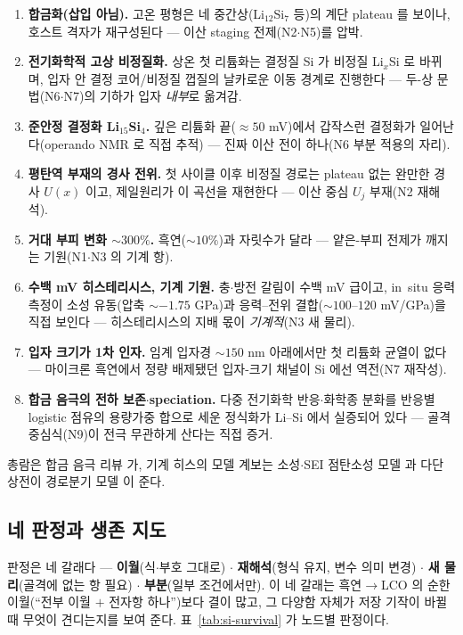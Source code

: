 \begin{enumerate}[label=(\roman*),leftmargin=2.2em,itemsep=1.5pt]
\item \textbf{합금화(삽입 아님).} 고온 평형은 네 중간상(Li$_{12}$Si$_7$ 등)의 계단 plateau 를
보이나\cite{wen_huggins1981}, 호스트 격자가 재구성된다 --- 이산 staging 전제(N2$\cdot$N5)를 압박.
\item \textbf{전기화학적 고상 비정질화.} 상온 첫 리튬화는 결정질 Si 가 비정질 Li$_x$Si 로 바뀌며,
입자 안 결정 코어/비정질 껍질의 날카로운 이동 경계로 진행한다\cite{limthongkul2003,li_dahn2007} ---
두-상 문법(N6$\cdot$N7)의 기하가 입자 \emph{내부}로 옮겨감.
\item \textbf{준안정 결정화 Li$_{15}$Si$_4$.} 깊은 리튬화 끝($\approx50$ mV)에서 갑작스런 결정화가
일어난다\cite{obrovac_christensen2004}(operando NMR 로 직접 추적\cite{ogata_nmr2014}) --- 진짜 이산
전이 하나(N6 부분 적용의 자리).
\item \textbf{평탄역 부재의 경사 전위.} 첫 사이클 이후 비정질 경로는 plateau 없는 완만한 경사 $U(x)$ 이고,
제일원리가 이 곡선을 재현한다\cite{chevrier_dahn2009} --- 이산 중심 $U_j$ 부재(N2 재해석).
\item \textbf{거대 부피 변화 $\sim300\%$.}\cite{beaulieu2001} 흑연($\sim10\%$)과 자릿수가 달라 ---
얕은-부피 전제가 깨지는 기원(N1$\cdot$N3 의 기계 항).
\item \textbf{수백 mV 히스테리시스, 기계 기원.} 충$\cdot$방전 갈림이 수백 mV 급이고, in~situ 응력 측정이
소성 유동(압축 $\sim-1.75$ GPa)과 응력--전위 결합($\sim100$--$120$ mV/GPa)을 직접
보인다\cite{sethuraman_stressevo2010,sethuraman_stresspot2010} --- 히스테리시스의 지배 몫이
\emph{기계적}(N3 새 물리).
\item \textbf{입자 크기가 1차 인자.} 임계 입자경 $\sim150$ nm 아래에서만 첫 리튬화 균열이
없다\cite{liu_sizefracture2012} --- 마이크론 흑연에서 정량 배제됐던 입자-크기 채널이 Si 에선 역전(N7 재작성).
\item \textbf{합금 음극의 전하 보존$\cdot$speciation.} 다중 전기화학 반응$\cdot$화학종 분화를 반응별
logistic 점유의 용량가중 합으로 세운 정식화가 Li--Si 에서 실증되어
있다\cite{verbrugge_lisi2016} --- 골격 중심식(N9)이 전극 무관하게 산다는 직접 증거.
\end{enumerate}
총람은 합금 음극 리뷰\cite{obrovac_chevrier2014} 가, 기계 히스의 모델 계보는 소성$\cdot$SEI 점탄소성
모델\cite{koebbing2024} 과 다단 상전이 경로분기 모델\cite{jiang_sihys2020} 이 준다.

\subsection{네 판정과 생존 지도}\label{ssec:si-verdicts}
판정은 네 갈래다 --- \textbf{이월}(식$\cdot$부호 그대로) $\cdot$ \textbf{재해석}(형식 유지, 변수 의미
변경) $\cdot$ \textbf{새 물리}(골격에 없는 항 필요) $\cdot$ \textbf{부분}(일부 조건에서만). 이 네 갈래는
흑연$\to$LCO 의 순한 이월(``전부 이월 $+$ 전자항 하나'')보다 결이 많고, 그 다양함 자체가 저장 기작이
바뀔 때 무엇이 견디는지를 보여 준다. 표~\ref{tab:si-survival} 가 노드별 판정이다.

